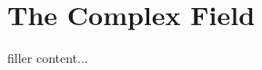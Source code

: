 \documentclass[../../templates/section]{subfiles}
\begin{document}
\section{The Complex Field}\label{sec:the-complex-field}

filler content...
\end{document}
